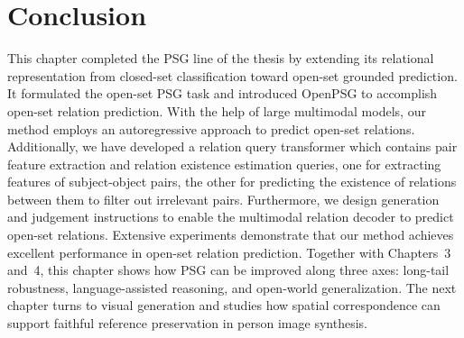 \section{Conclusion}
\label{openpsg:sec:conclusion}
This chapter completed the PSG line of the thesis by extending its relational representation from closed-set classification toward open-set grounded prediction.
It formulated the open-set PSG task and introduced OpenPSG to accomplish open-set relation prediction.
With the help of large multimodal models, our method employs an autoregressive approach to predict open-set relations.
Additionally, we have developed a relation query transformer which contains pair feature extraction and relation existence estimation queries, one for extracting features of subject-object pairs, the other for predicting the existence of relations between them to filter out irrelevant pairs. 
Furthermore, we design generation and judgement instructions to enable the multimodal relation decoder to predict open-set relations.
Extensive experiments demonstrate that our method achieves excellent performance in open-set relation prediction.
Together with Chapters~3 and~4, this chapter shows how PSG can be improved along three axes: long-tail robustness, language-assisted reasoning, and open-world generalization.
The next chapter turns to visual generation and studies how spatial correspondence can support faithful reference preservation in person image synthesis.
